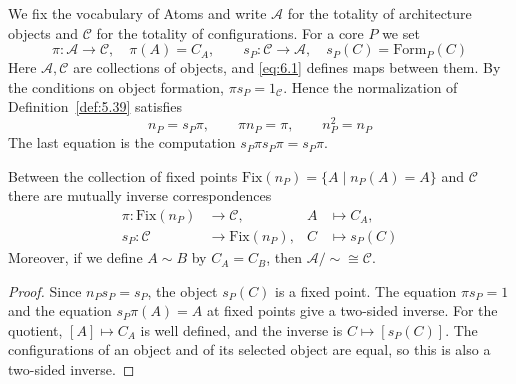 \begin{construction}\label{cons:6.1}

We fix the vocabulary of Atoms and write $\mathcal{A}$ for the totality of architecture
objects and $\mathcal{C}$ for the totality of configurations. For a core $P$ we set
\begin{equation*}
\pi:\mathcal{A}\longrightarrow\mathcal{C},\quad \pi(A)=C_A,
\qquad
s_P:\mathcal{C}\longrightarrow\mathcal{A},\quad s_P(C)=\mathrm{Form}_P(C)
\tag{6.1}\label{eq:6.1}
\end{equation*}
Here $\mathcal{A},\mathcal{C}$ are collections of objects, and \eqref{eq:6.1} defines maps
between them.
By the conditions on object formation, $\pi s_P=1_{\mathcal{C}}$.
Hence the normalization of Definition~\ref{def:5.39} satisfies
\begin{equation*}
n_P=s_P\pi,\qquad \pi n_P=\pi,\qquad n_P^2=n_P
\tag{6.2}\label{eq:6.2}
\end{equation*}
The last equation is the computation $s_P\pi s_P\pi=s_P\pi$.

\end{construction}

\begin{proposition}\label{prop:6.2}

Between the collection of fixed points $\mathrm{Fix}(n_P)=\{A\mid n_P(A)=A\}$ and
$\mathcal{C}$ there are mutually inverse correspondences
\begin{equation*}
\begin{aligned}
\pi:\mathrm{Fix}(n_P)&\longrightarrow\mathcal{C},& A&\longmapsto C_A,\\
s_P:\mathcal{C}&\longrightarrow\mathrm{Fix}(n_P),& C&\longmapsto s_P(C)
\end{aligned}
\tag{6.3}\label{eq:6.3}
\end{equation*}
Moreover, if we define $A\sim B$ by $C_A=C_B$, then
$\mathcal{A}/{\sim}\cong\mathcal{C}$.

\end{proposition}

\begin{proof}

Since $n_Ps_P=s_P$, the object $s_P(C)$ is a fixed point.
The equation $\pi s_P=1$ and the equation $s_P\pi(A)=A$ at fixed points give a two-sided
inverse.
For the quotient, $[A]\mapsto C_A$ is well defined, and the inverse is $C\mapsto[s_P(C)]$.
The configurations of an object and of its selected object are equal, so this is also a
two-sided inverse.

\end{proof}

